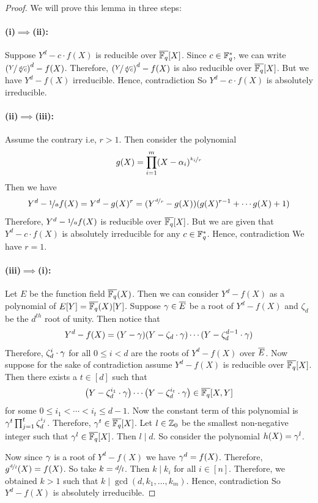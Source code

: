\begin{proof}We will prove this lemma in three steps:
  \paragraph*{(i)$\implies$(ii):} Suppose $Y^d-c\cdot f(X)$ is reducible over $\overline{\mathbb{F}_q}[X]$. Since $c\in\mathbb{F}_q^*$, we can write $\left(\nicefrac{Y}{\sqrt[d]{c}}\right)^d - f(X)$. Therefore, $\left(\nicefrac{Y}{\sqrt[d]{c}}\right)^d - f(X)$ is also reducible over $\overline{\mathbb{F}_q}[X]$. But we have $Y^d-f(X)$ irreducible. Hence, contradiction \ctr So $Y^d-c\cdot f(X)$ is absolutely irreducible.

  \paragraph*{(ii)$\implies$(iii):} Assume the contrary i.e, $r>1$. Then consider the polynomial $$g(X)=\prod_{i=1}^{m}(X-\alpha_i)^{\nicefrac{k_i}r}$$Then we have $$Y^d-\nicefrac1a f(X)=Y^d-g(X)^r=(Y^{\nicefrac{d}r}-g(X))(g(X)^{r-1}+\cdots g(X)+1)$$Therefore, $Y^d-\nicefrac1a f(X)$ is reducible over $\overline{\mathbb{F}_q}[X]$. But we are given that $Y^d-c\cdot f(X)$ is absolutely irreducible for any $c\in\mathbb{F}_q^*$. Hence, contradiction \ctr We have $r=1$. 

  \paragraph*{(iii)$\implies$(i):} Let $E$ be the function field $\overline{\mathbb{F}_q}(X)$. Then we can consider $Y^d-f(X)$ as a polynomial of $E[Y]=\overline{\mathbb{F}_q}(X)[Y]$. Suppose $\gamma\in \overline{E}$ be a root of $Y^d-f(X)$ and $\zeta_d$ be the $d^{th}$ root of unity. Then notice that $$Y^d-f(X)=(Y-\gamma)(Y-\zeta_d\cdot \gamma)\cdots (Y-\zeta_d^{d-1}\cdot \gamma)$$Therefore, $\zeta_d^i\cdot \gamma$ for all $0\leq i<d$ are the roots of $Y^d-f(X)$ over $\overline{E}$. Now suppose for the sake of contradiction assume $Y^d-f(X)$ is reducible over $\overline{\mathbb{F}_q}[X]$. Then there exists a $t\in[d]$ such that $$\left(Y-\zeta_d^{i_1}\cdot \gamma\right)\cdots \left(Y-\zeta_d^{i_t}\cdot \gamma\right)\in \overline{\mathbb{F}_q}[X,Y]$$ for some $0\leq i_1<\cdots <i_t\leq d-1$. Now the constant term of this polynomial is $\gamma^t\prod_{j=1}^t\zeta_d^{i_j}$. Therefore, $\gamma^t\in\overline{\mathbb{F}_q}[X]$. Let $l\in\mathbb{Z}_0$ be the smallest non-negative integer such that $\gamma^l\in\overline{\mathbb{F}_q}[X]$. Then $l\mid d$. So consider the polynomial $h(X)=\gamma^{l}$. 

  Now since $\gamma$ is a root of $Y^d-f(X)$ we have $\gamma^d=f(X)$. Therefore, $g^{\nicefrac{d}l}(X)=f(X)$. So take $k=\nicefrac{d}{l}$. Then $k\mid k_i$ for all $i\in[n]$. Therefore, we obtained $k>1$ such that $k\mid \gcd(d,k_1,\dots, k_m)$. Hence, contradiction \ctr So $Y^d-f(X)$ is absolutely irreducible. 
\end{proof}


